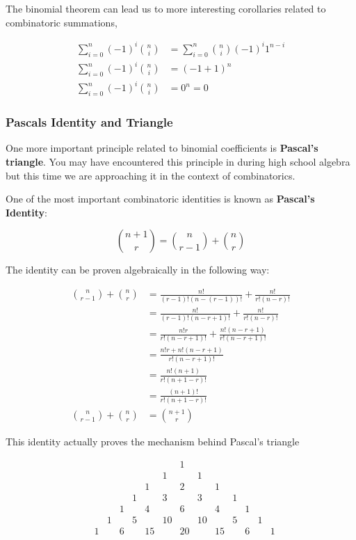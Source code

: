 The binomial theorem can lead us to more interesting corollaries related
to combinatoric summations,

\[
\begin{aligned}
\sum_{i=0}^{n}{(-1)^i{n \choose i}}&=\sum_{i=0}^{n}{n \choose i}(-1)^i 1^{n-i}\\
\sum_{i=0}^{n}{(-1)^i{n \choose i}}&=(-1+1)^n\\
\sum_{i=0}^{n}{(-1)^i {n \choose i}}&=0^n=0
\end{aligned}
\]

\hypertarget{pascals-identity-and-triangle}{%
\subsubsection{Pascals Identity and
Triangle}\label{pascals-identity-and-triangle}}

One more important principle related to binomial coefficients is
\textbf{Pascal's triangle}. You may have encountered this principle in
during high school algebra but this time we are approaching it in the
context of combinatorics.

One of the most important combinatoric identities is known as
\textbf{Pascal's Identity}:

\[
{n+1 \choose r}={n \choose r-1}+{n \choose r}
\]

The identity can be proven algebraically in the following way:

\[
\begin{aligned}
{n \choose r-1}+{n \choose r}&=\frac{n!}{(r-1)!(n-(r-1))!}+\frac{n!}{r!(n-r)!}\\
&=\frac{n!}{(r-1)!(n-r+1)!}+\frac{n!}{r!(n-r)!}\\
&=\frac{n!r}{r!(n-r+1)!}+\frac{n!(n-r+1)}{r!(n-r+1)!}\\
&=\frac{n!r+n!(n-r+1)}{r!(n-r+1)!}\\
&=\frac{n!(n+1)}{r!(n+1-r)!}\\
&=\frac{(n+1)!}{r!(n+1-r)!}\\
{n \choose r-1}+{n \choose r}&={n+1 \choose r}
\end{aligned}
\]

This identity actually proves the mechanism behind Pascal's triangle

\[
\begin{array}{ccccccccccccc}
& & & & & & &1& & & & &\\
& & & & & &1& &1& & & &\\
& & & & &1& &2& &1& & &\\
& & & &1& &3& &3& &1& &\\
& & &1& &4& &6& &4& &1&\\
& &1& &5& &10& &10& &5& &1\\
&1& &6& &15& &20& &15& &6& &1
\end{array}
\]

